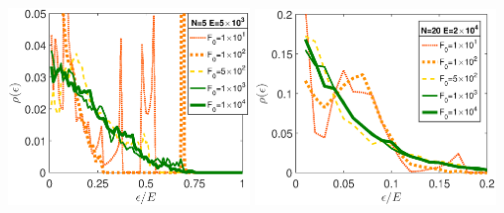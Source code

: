 \documentclass{minimal}
\begin{document}
\includegraphics[width=0.48\textwidth]{N=5_energydistribution_500_400_Font16.eps} 
\includegraphics[width=0.48\textwidth]{N=20_energydistribution_500_400_Font16.eps}
\end{document}
